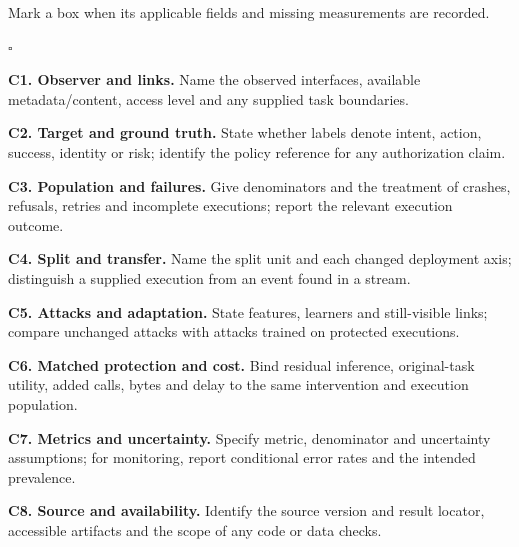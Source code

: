 Mark a box when its applicable fields and missing measurements are recorded.

\begin{list}{$\square$}{\setlength{\leftmargin}{1.4em}\setlength{\labelwidth}{1em}\setlength{\labelsep}{.4em}\setlength{\itemsep}{3pt}\setlength{\parsep}{0pt}}
\item \textbf{C1. Observer and links.} Name the observed interfaces, available metadata/content, access level and any supplied task boundaries.
\item \textbf{C2. Target and ground truth.} State whether labels denote intent, action, success, identity or risk; identify the policy reference for any authorization claim.
\item \textbf{C3. Population and failures.} Give denominators and the treatment of crashes, refusals, retries and incomplete executions; report the relevant execution outcome.
\item \textbf{C4. Split and transfer.} Name the split unit and each changed deployment axis; distinguish a supplied execution from an event found in a stream.
\item \textbf{C5. Attacks and adaptation.} State features, learners and still-visible links; compare unchanged attacks with attacks trained on protected executions.
\item \textbf{C6. Matched protection and cost.} Bind residual inference, original-task utility, added calls, bytes and delay to the same intervention and execution population.
\item \textbf{C7. Metrics and uncertainty.} Specify metric, denominator and uncertainty assumptions; for monitoring, report conditional error rates and the intended prevalence.
\item \textbf{C8. Source and availability.} Identify the source version and result locator, accessible artifacts and the scope of any code or data checks.
\end{list}

